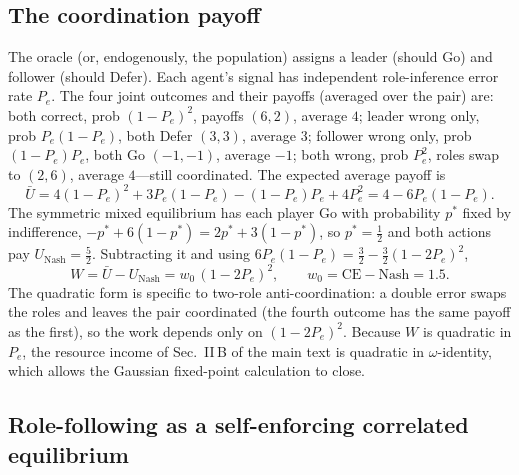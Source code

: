 \documentclass[
  aps,prx,
  preprint,
  superscriptaddress,
  nofootinbib
]{revtex4-2}
\begin{document}
\subsection{The coordination payoff}\label{sm:payoff}

\noindent The oracle (or, endogenously, the population) assigns a leader (should Go) and follower (should Defer). Each agent's signal has independent role-inference error rate $P_e$. The four joint outcomes and their payoffs (averaged over the pair) are: both correct, prob $(1-P_e)^2$, payoffs $(6,2)$, average $4$; leader wrong only, prob $P_e(1-P_e)$, both Defer $(3,3)$, average $3$; follower wrong only, prob $(1-P_e)P_e$, both Go $(-1,-1)$, average $-1$; both wrong, prob $P_e^2$, roles swap to $(2,6)$, average $4$---still coordinated. The expected average payoff is
\begin{equation}
\bar U = 4(1-P_e)^2 + 3P_e(1-P_e) - (1-P_e)P_e + 4P_e^2 = 4 - 6P_e(1-P_e).
\end{equation}
The symmetric mixed equilibrium has each player Go with probability $p^\ast$ fixed by indifference, $-p^\ast+6(1-p^\ast)=2p^\ast+3(1-p^\ast)$, so $p^\ast=\tfrac12$ and both actions pay $U_{\mathrm{Nash}}=\tfrac52$. Subtracting it and using $6P_e(1-P_e)=\tfrac32-\tfrac32(1-2P_e)^2$,
\begin{equation}\label{SM-eq:sm-work}
W = \bar U - U_{\mathrm{Nash}} = w_0\,(1-2P_e)^2, \qquad w_0 = \mathrm{CE}-\mathrm{Nash} = 1.5 .
\end{equation}
The quadratic form is specific to two-role anti-coordination: a double error swaps the roles and leaves the pair coordinated (the fourth outcome has the same payoff as the first), so the work depends only on $(1-2P_e)^2$. Because $W$ is quadratic in $P_e$, the resource income of Sec.~II\,B of the main text is quadratic in $\omega$-identity, which allows the Gaussian fixed-point calculation to close.

\subsection{Role-following as a self-enforcing correlated equilibrium}\label{sm:ce}
\end{document}
